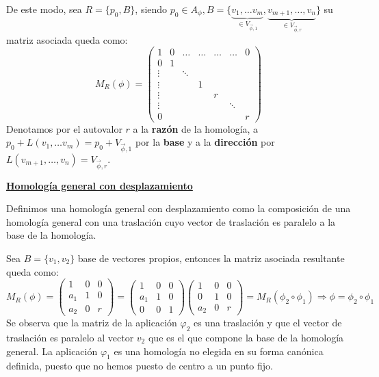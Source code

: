 \documentclass[10pt,a4paper,openright]{book}
\theoremstyle{break}
\begin{document}
De este modo, sea $R = \{p_0, B\}$, siendo $p_0 \in A_\phi, B = \{\underbrace{ v_1, \ldots v_m}_{\in V_{\vec{\phi}, 1}}, \underbrace{v_{m+1}, \ldots, v_n}_{\in V_{\vec{\phi}, r}}\}$ su matriz asociada queda como:
$$M_{R} (\phi) = \left(\begin{array}{c|cccccc}
1  & 0 &  \ldots & \ldots & \ldots & \ldots& 0 \\
\hline
0  & 1 & & & & & \\
\vdots & & \ddots & & & & \\
\vdots &  & & 1 & & \\
\vdots &  & &  & r & \\
\vdots & & & & & \ddots & \\
0 & & & & & &  r
\end{array}
\right)$$
Denotamos por el autovalor $r$ a la \textbf{razón} de la homología, a $p_0 + L(v_1, \ldots v_m) = p_0 + V_{\vec{\phi}, 1}$ por la \textbf{base} y a la \textbf{dirección} por $L(v_{m+1}, \ldots, v_n) =  V_{\vec{\phi}, r}$.

\underline{\textbf{Homología general con desplazamiento}}

Definimos una homología general con desplazamiento como la composición de una homología general con una traslación cuyo vector de traslación es paralelo a la base de la homología.

Sea $B = \{v_1, v_2\}$ base de vectores propios, entonces la matriz asociada resultante queda como:
$$M_R (\phi) = \begin{pmatrix} 1 & 0 & 0 \\ a_1 & 1 & 0 \\ a_2 & 0 & r \end{pmatrix} = \left(\begin{array}{c|cc}
1  & 0 & 0 \\
\hline
a_1 & 1 &  0 \\
0 & 0 &  1
\end{array}
\right) \left(\begin{array}{c|cc}
1  & 0 & 0 \\
\hline
0 & 1 &  0 \\
a_2 & 0 &  r
\end{array}
\right) = M_R (\phi_2 \circ \phi_1) \Rightarrow \phi = \phi_2 \circ \phi_1 $$
Se observa que la matriz de la aplicación $\varphi_2$ es una traslación y que el vector de traslación es paralelo al vector $v_2$ que es el que compone la base de la homología general. La aplicación $\varphi_1$ es una homología no elegida en su forma canónica definida, puesto que no hemos puesto de centro a un punto fijo.
\end{document}
